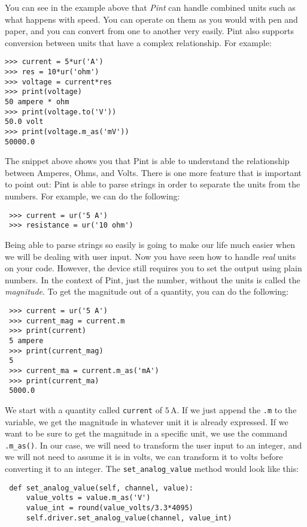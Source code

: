 You can see in the example above that \emph{Pint} can handle combined units such as what happens with speed. You can operate on them as you would with pen and paper, and you can convert from one to another very easily. Pint also supports conversion between units that have a complex relationship. For example:

\begin{verbatim}
>>> current = 5*ur('A')
>>> res = 10*ur('ohm')
>>> voltage = current*res
>>> print(voltage)
50 ampere * ohm
>>> print(voltage.to('V'))
50.0 volt
>>> print(voltage.m_as('mV'))
50000.0
\end{verbatim}

The snippet above shows you that Pint is able to understand the relationship between Amperes, Ohms, and Volts. There is one more feature that is important to point out: Pint is able to parse strings in order to separate the units from the numbers. For example, we can do the following:

\begin{verbatim}
 >>> current = ur('5 A')
 >>> resistance = ur('10 ohm')
\end{verbatim}

Being able to parse strings so easily is going to make our life much easier when we will be dealing with user input. Now you have seen how to handle \emph{real} units on your code. However, the device still requires you to set the output using plain numbers. In the context of Pint, just the number, without the units is called the \emph{magnitude}. To get the magnitude out of a quantity, you can do the following:

\begin{verbatim}
 >>> current = ur('5 A')
 >>> current_mag = current.m
 >>> print(current)
 5 ampere
 >>> print(current_mag)
 5
 >>> current_ma = current.m_as('mA')
 >>> print(current_ma)
 5000.0
\end{verbatim}

We start with a quantity called \texttt{current} of $5\,\textrm{A}$. If we just append the \texttt{.m} to the variable, we get the magnitude in whatever unit it is already expressed. If we want to be sure to get the magnitude in a specific unit, we use the command \texttt{.m\_as()}. In our case, we will need to transform the user input to an integer, and we will not need to assume it is in volts, we can transform it to volts before converting it to an integer. The \texttt{set\_analog\_value} method would look like this:

\begin{verbatim}
 def set_analog_value(self, channel, value):
     value_volts = value.m_as('V')
     value_int = round(value_volts/3.3*4095)
     self.driver.set_analog_value(channel, value_int)
\end{verbatim}

